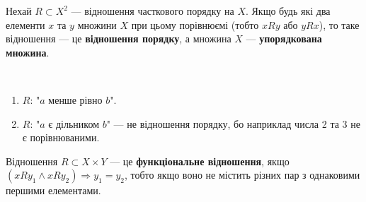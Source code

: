 Нехай $R \subset X^2$ --- відношення часткового порядку на $X$. Якщо будь які два елементи
$x$ та $y$ множини $X$ при цьому порівнюємі (тобто $xRy$ або $yRx$), то таке відношення ---
це \textbf{відношення порядку}, а множина $X$ --- \textbf{упорядкована множина}.

\begin{example}~

    \begin{enumerate}
        \item $R$: "$a$ менше рівно $b$".
        \item $R$: "$a$ є дільником $b$" --- не відношення порядку, бо наприклад числа 2 та 3
            не є порівнюваними.
    \end{enumerate}
\end{example}

Відношення $R \subset X \times Y$ --- це \textbf{функціональне відношення}, якщо 
$(xRy_1 \wedge xRy_2) \Rightarrow y_1 = y_2$, тобто якщо воно не містить різних пар з
однаковими першими елементами.

